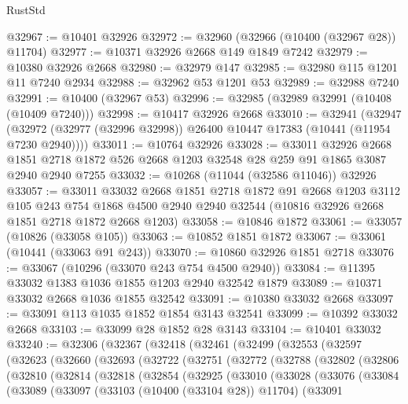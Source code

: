 \begin{lexlean}{RustStd}
\begin{coremodule}
@32967 := @10401 @32926
@32972 := @32960 (@32966 (@10400 (@32967 @28)) @11704)
@32977 := @10371 @32926 @2668 @149 @1849 @7242
@32979 := @10380 @32926 @2668
@32980 := @32979 @147
@32985 := @32980 @115 @1201 @11 @7240 @2934
@32988 := @32962 @53 @1201 @53
@32989 := @32988 @7240
@32991 := @10400 (@32967 @53)
@32996 := @32985 (@32989 @32991 (@10408 (@10409 @7240)))
@32998 := @10417 @32926 @2668
@33010 := @32941
    (@32947 (@32972 (@32977 (@32996 @32998)) @26400 @10447 @17383 (@10441 (@11954 @7230 @2940))))
@33011 := @10764 @32926
@33028 := @33011
    @32926
    @2668
    @1851
    @2718
    @1872
    @526
    @2668
    @1203
    @32548
    @28
    @259
    @91
    @1865
    @3087
    @2940
    @2940
    @7255
@33032 := @10268 (@11044 (@32586 @11046)) @32926
@33057 := @33011
    @33032
    @2668
    @1851
    @2718
    @1872
    @91
    @2668
    @1203
    @3112
    @105
    @243
    @754
    @1868
    @4500
    @2940
    @2940
    @32544
    (@10816 @32926 @2668 @1851 @2718 @1872 @2668 @1203)
@33058 := @10846 @1872
@33061 := @33057 (@10826 (@33058 @105))
@33063 := @10852 @1851 @1872
@33067 := @33061 (@10441 (@33063 @91 @243))
@33070 := @10860 @32926 @1851 @2718
@33076 := @33067 (@10296 (@33070 @243 @754 @4500 @2940))
@33084 := @11395 @33032 @1383 @1036 @1855 @1203 @2940 @32542 @1879
@33089 := @10371 @33032 @2668 @1036 @1855 @32542
@33091 := @10380 @33032 @2668
@33097 := @33091 @113 @1035 @1852 @1854 @3143 @32541
@33099 := @10392 @33032 @2668
@33103 := @33099 @28 @1852 @28 @3143
@33104 := @10401 @33032
@33240 := @32306
    (@32367
      (@32418
        (@32461
          (@32499
            (@32553
              (@32597
                (@32623
                  (@32660
                    (@32693
                      (@32722
                        (@32751
                          (@32772
                            (@32788
                              (@32802
                                (@32806
                                  (@32810
                                    (@32814
                                      (@32818
                                        (@32854
                                          (@32925
                                            (@33010
                                              (@33028
                                                (@33076
                                                  (@33084
                                                    (@33089
                                                      (@33097
                                                        (@33103 (@10400 (@33104 @28)) @11704)
                                                        (@33091

\end{coremodule}
\end{lexlean}
